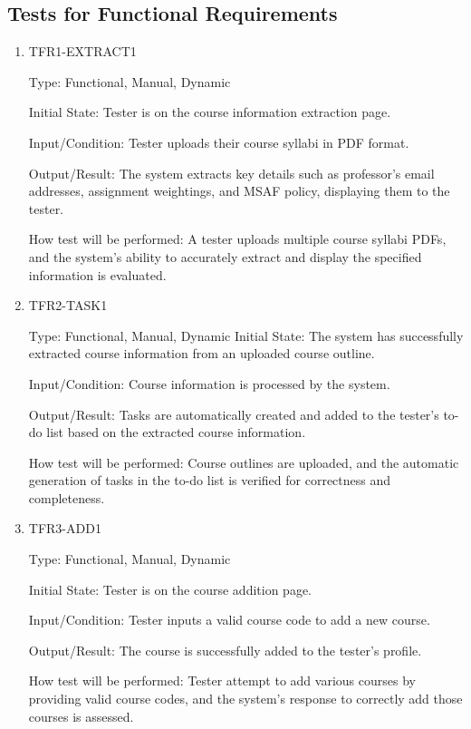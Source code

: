 \documentclass[12pt, titlepage]{article}
\begin{document}
\subsection{Tests for Functional Requirements}

\begin{enumerate}
\item{TFR1-EXTRACT1\\}\label{TFR1-EXTRACT1}

Type: Functional, Manual, Dynamic

Initial State: Tester is on the course information extraction page.

Input/Condition: Tester uploads their course syllabi in PDF format.

Output/Result: The system extracts key details such as professor's email addresses, assignment weightings, and MSAF policy, displaying them to the tester.

How test will be performed: A tester uploads multiple course syllabi PDFs, and the system's ability to accurately extract and display the specified information is evaluated.

\item{TFR2-TASK1\\}\label{TFR2-TASK1}

Type: Functional, Manual, Dynamic
Initial State: The system has successfully extracted course information from an uploaded course outline.

Input/Condition: Course information is processed by the system.

Output/Result: Tasks are automatically created and added to the tester's to-do list based on the extracted course information.

How test will be performed: Course outlines are uploaded, and the automatic generation of tasks in the to-do list is verified for correctness and completeness.

\item{TFR3-ADD1\\}\label{TFR3-ADD1}

Type: Functional, Manual, Dynamic

Initial State: Tester is on the course addition page.

Input/Condition: Tester inputs a valid course code to add a new course.

Output/Result: The course is successfully added to the tester's profile.

How test will be performed: Tester attempt to add various courses by providing valid course codes, and the system's response to correctly add those courses is assessed.


\end{enumerate}
\end{document}
